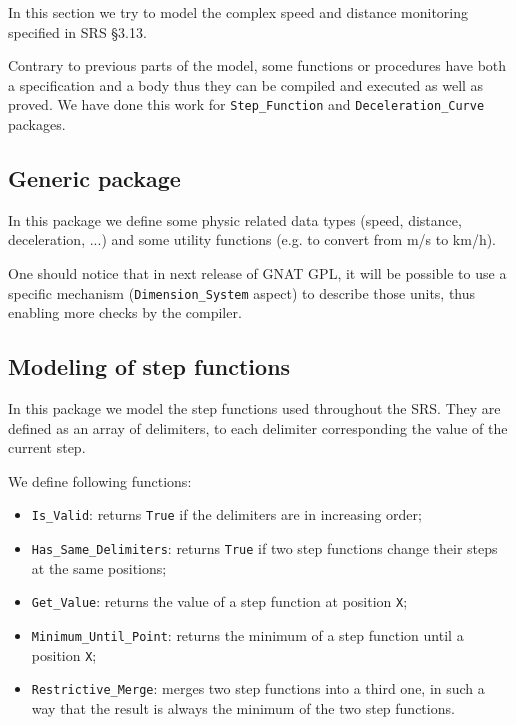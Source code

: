 \documentclass{template/openetcs_report}
\newcommand{\Ada}[1]{\lstinline[language=Ada,basicstyle={\sffamily},framesep=0pt]{#1}}
\begin{document}
In this section we try to model the complex speed and distance
monitoring specified in SRS §3.13.

Contrary to previous parts of the model, some functions or procedures
have both a specification and a body thus they can be compiled and
executed as well as proved. We have done this work for
\Ada{Step_Function} and \Ada{Deceleration_Curve} packages.

\subsection{Generic package}

In this package we define some physic related data types (speed,
distance, deceleration, ...) and some utility functions (e.g. to
convert from m/s to km/h).

One should notice that in next release of GNAT GPL, it will be
possible to use a specific mechanism (\Ada{Dimension_System} aspect)
to describe those units, thus enabling more checks by the compiler.




\subsection{Modeling of step functions}
\label{sec:step-function}

In this package we model the step functions used throughout the
SRS. They are defined as an array of delimiters, to each delimiter
corresponding the value of the current step.

We define following functions:
\begin{itemize}
\item \Ada{Is_Valid}: returns \Ada{True} if the delimiters are in
  increasing order;
\item \Ada{Has_Same_Delimiters}: returns \Ada{True} if two step
  functions change their steps at the same positions;
\item \Ada{Get_Value}: returns the value of a step function at
  position \Ada{X};
\item \Ada{Minimum_Until_Point}: returns the minimum of a step
  function until a position \Ada{X};
\item \Ada{Restrictive_Merge}: merges two step functions into a third
  one, in such a way that the result is always the minimum of the two
  step functions.
\end{itemize}
\end{document}
